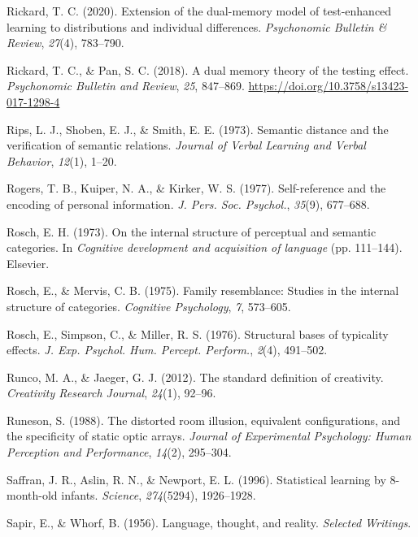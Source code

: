 \documentclass[
]{krantz}
\newlength{\cslhangindent}
\newenvironment{CSLReferences}[2] %
 {\begin{list}{}{%
  \setlength{\itemindent}{0pt}
  \setlength{\leftmargin}{0pt}
  \setlength{\parsep}{0pt}
  \ifodd #1
   \setlength{\leftmargin}{\cslhangindent}
   \setlength{\itemindent}{-1\cslhangindent}
  \fi
  \setlength{\itemsep}{#2\baselineskip}}}
 {\end{list}}
\begin{document}
\begin{CSLReferences}{1}{0}
Rickard, T. C. (2020). Extension of the dual-memory model of test-enhanced learning to distributions and individual differences. \emph{Psychonomic Bulletin \& Review}, \emph{27}(4), 783--790.

Rickard, T. C., \& Pan, S. C. (2018). A dual memory theory of the testing effect. \emph{Psychonomic Bulletin and Review}, \emph{25}, 847--869. \url{https://doi.org/10.3758/s13423-017-1298-4}

Rips, L. J., Shoben, E. J., \& Smith, E. E. (1973). Semantic distance and the verification of semantic relations. \emph{Journal of Verbal Learning and Verbal Behavior}, \emph{12}(1), 1--20.

Rogers, T. B., Kuiper, N. A., \& Kirker, W. S. (1977). Self-reference and the encoding of personal information. \emph{J. Pers. Soc. Psychol.}, \emph{35}(9), 677--688.

Rosch, E. H. (1973). On the internal structure of perceptual and semantic categories. In \emph{Cognitive development and acquisition of language} (pp. 111--144). Elsevier.

Rosch, E., \& Mervis, C. B. (1975). Family resemblance: Studies in the internal structure of categories. \emph{Cognitive Psychology}, \emph{7}, 573--605.

Rosch, E., Simpson, C., \& Miller, R. S. (1976). Structural bases of typicality effects. \emph{J. Exp. Psychol. Hum. Percept. Perform.}, \emph{2}(4), 491--502.

Runco, M. A., \& Jaeger, G. J. (2012). The standard definition of creativity. \emph{Creativity Research Journal}, \emph{24}(1), 92--96.

Runeson, S. (1988). The distorted room illusion, equivalent configurations, and the specificity of static optic arrays. \emph{Journal of Experimental Psychology: Human Perception and Performance}, \emph{14}(2), 295--304.

Saffran, J. R., Aslin, R. N., \& Newport, E. L. (1996). Statistical learning by 8-month-old infants. \emph{Science}, \emph{274}(5294), 1926--1928.

Sapir, E., \& Whorf, B. (1956). Language, thought, and reality. \emph{Selected Writings}.


\end{CSLReferences}
\end{document}
